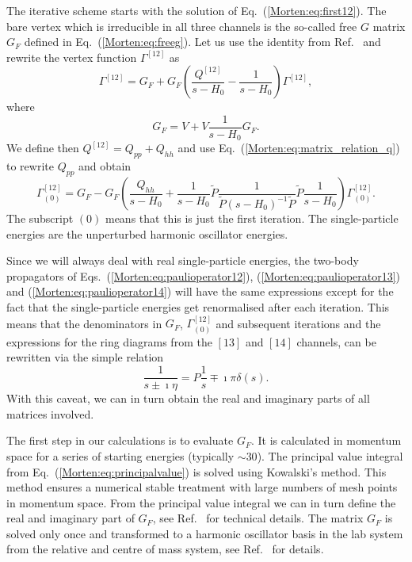 The iterative scheme starts with the solution of Eq.~(\ref{Morten:eq:first12}).
The bare vertex which is irreducible in all three channels
is the so-called free $G$ matrix $G_F$ defined in Eq.~(\ref{Morten:eq:freeg}).
Let us use the identity from Ref.~ and rewrite the
vertex function $\Gamma^{[12]}$ as
\begin{equation}
    \Gamma^{[12]}=G_F+G_F\left(\frac{Q^{[12]}}{s-H_0}
                               -\frac{1}{s-H_0}\right)\Gamma^{[12]},
\end{equation}
where 
\[
  G_F = V+V\frac{1}{s-H_0}G_F.
\]
We define then $Q^{[12]}=Q_{pp}+Q_{hh}$ and use
Eq.~(\ref{Morten:eq:matrix_relation_q}) to rewrite $Q_{pp}$ and obtain
\begin{equation}
   \Gamma^{[12]}_{(0)}=G_F-G_F\left(\frac{Q_{hh}}{s-H_0}+
   \frac{1}{s-H_0}\tilde{P}\frac{1}{\tilde{P}(s-H_0)^{-1}
   \tilde{P}}\tilde{P}\frac{1}{s-H_0}\right)\Gamma^{[12]}_{(0)}.
   \label{Morten:eq:approx12channel}
\end{equation}
The subscript $(0)$ means that this is just the first iteration.
The single-particle energies are the unperturbed
harmonic oscillator energies.  

Since we will always deal with real single-particle energies,
the two-body propagators of Eqs.~(\ref{Morten:eq:paulioperator12}),
(\ref{Morten:eq:paulioperator13}) and (\ref{Morten:eq:paulioperator14})
will have the same expressions except for the fact that
the single-particle energies get renormalised after each 
iteration. This means that 
the denominators 
in $G_F$, $\Gamma^{[12]}_{(0)}$ and subsequent iterations
and the expressions for the ring diagrams from the $[13]$ and 
$[14]$ channels, 
can be rewritten  via the simple relation
\begin{equation}
     \frac{1}{s\pm \imath\eta}=P\frac{1}{s}\mp\imath\pi\delta(s).
     \label{Morten:eq:principalvalue}
\end{equation}
With this caveat, we can in turn obtain the real and imaginary parts
of all matrices involved.

The first step in our calculations is to evaluate $G_F$.  It is 
calculated in momentum space for a series of starting
energies (typically $\sim 30$).
The principal value integral from Eq.~(\ref{Morten:eq:principalvalue})
is solved  using Kowalski's
\cite{Morten:kowalski67} 
method. This method  ensures a numerical 
stable treatment with large numbers of
mesh points in momentum space. From the principal value integral we
can in turn define the real and imaginary part of $G_F$, see 
Ref.~ for technical details.
The matrix $G_F$ is solved only once and transformed
to a harmonic oscillator basis in the lab system from the 
relative and centre of mass system, see Ref.~
for details.



